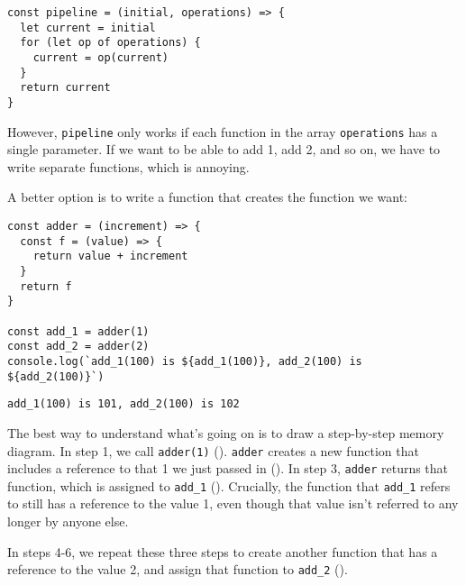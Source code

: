 \begin{verbatim}
const pipeline = (initial, operations) => {
  let current = initial
  for (let op of operations) {
    current = op(current)
  }
  return current
}
\end{verbatim}

However,
\texttt{pipeline} only works if each function in the array \texttt{operations} has a single parameter.
If we want to be able to add 1,
add 2,
and so on,
we have to write separate functions,
which is annoying.

A better option is to write a function that creates the function we want:

\begin{verbatim}
const adder = (increment) => {
  const f = (value) => {
    return value + increment
  }
  return f
}

const add_1 = adder(1)
const add_2 = adder(2)
console.log(`add_1(100) is ${add_1(100)}, add_2(100) is ${add_2(100)}`)
\end{verbatim}

\begin{verbatim}
add_1(100) is 101, add_2(100) is 102
\end{verbatim}

The best way to understand what's going on is to draw a step-by-step memory diagram.
In step 1, we call \texttt{adder(1)}
().
\texttt{adder} creates a new function that includes a reference to that 1 we just passed in
().
In step 3,
\texttt{adder} returns that function, which is assigned to \texttt{add\_1}
().
Crucially,
the function that \texttt{add\_1} refers to still has a reference to the value 1,
even though that value isn't referred to any longer by anyone else.




In steps 4-6,
we repeat these three steps to create another function that has a reference to the value 2,
and assign that function to \texttt{add\_2}
().


